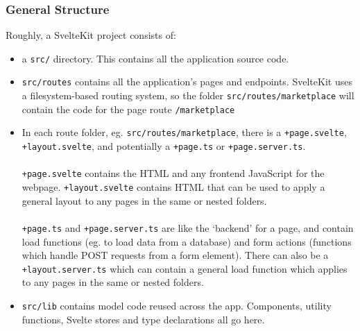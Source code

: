 \documentclass[12pt,a4paper]{article}
\begin{document}
\subsubsection{General Structure}
Roughly, a SvelteKit project consists of:
\begin{itemize}
    \item a \verb|src/| directory. This contains all the application source code.
    \item \verb|src/routes| contains all the application's pages and endpoints. SvelteKit uses a filesystem-based routing system, so the folder \verb|src/routes/marketplace| will contain the code for the page route \verb|/marketplace|
    \item In each route folder, eg. \verb|src/routes/marketplace|, there is a \verb|+page.svelte|, \verb|+layout.svelte|, and potentially a \verb|+page.ts| or \verb|+page.server.ts|.\\\\ \verb|+page.svelte| contains the HTML and any frontend JavaScript for the webpage. \verb|+layout.svelte| contains HTML that can be used to apply a general layout to any pages in the same or nested folders. \\\\\verb|+page.ts| and \verb|+page.server.ts| are like the `backend' for a page, and contain load functions (eg. to load data from a database) and form actions (functions which handle POST requests from a form element). There can also be a \verb|+layout.server.ts| which can contain a general load function which applies to any pages in the same or nested folders.
    \item \verb|src/lib| contains model code reused across the app. Components, utility functions, Svelte stores and type declarations all go here.
\end{itemize}
\end{document}
